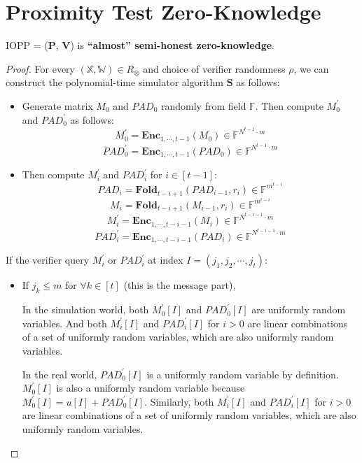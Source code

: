 \section{Proximity Test Zero-Knowledge}

\begin{lemma}
\label{lemma:szkpc-zk}

IOPP = ($\textbf{P}$, $\textbf{V}$) is \textbf{``almost'' semi-honest zero-knowledge}.

\end{lemma}
\begin{proof}

For every $(\mathbb{X}, \mathbb{W}) \in R_\otimes$ and choice of verifier randomness $\rho$, we can construct the polynomial-time simulator algorithm $\textbf{S}$ as follows:


\begin{itemize}
    \item Generate matrix $M_0$ and $PAD_0$ randomly from field $\mathbb{F}$. Then compute $M_0^\prime$ and $PAD_0^\prime$ as follows:
    $$
        M_0^{\prime} = \textbf{Enc}_{1,\cdots,t-1}(M_0) \in \mathbb{F}^{N^{t-1} \cdot m}
    $$
    $$
        PAD_0^{\prime} = \textbf{Enc}_{1,\cdots,t-1}(PAD_0) \in \mathbb{F}^{N^{t-1} \cdot m}
    $$
    \item Then compute $M_i^{\prime}$ and $PAD_i^\prime$ for $i \in [t-1]$:
    $$
        PAD_i = \textbf{Fold}_{t-i+1}(PAD_{i-1}, r_i) \in \mathbb{F}^{m^{t-i}}
    $$
    $$
        M_i = \textbf{Fold}_{t-i+1}(M_{i-1}, r_i) \in \mathbb{F}^{m^{t-i}}
    $$
    $$
        M_i^\prime =  \textbf{Enc}_{1, \cdots, t- i - 1}(M_i) \in \mathbb{F}^{N^{t-i-1} \cdot m}
    $$
    $$
        PAD_i^\prime =  \textbf{Enc}_{1, \cdots, t- i - 1}(PAD_i) \in \mathbb{F}^{N^{t-i-1} \cdot m}
    $$
\end{itemize}

If the verifier query $M_i^{\prime}$ or $PAD_i^\prime$ at index $I = (j_1, j_2, \cdots, j_t)$:

\begin{itemize}
    \item If $j_k \le m$ for $\forall k \in [t]$ (this is the message part),
    
    In the simulation world, both $M_0^\prime[I]$ and $PAD_0^\prime[I]$ are uniformly random variables. And both $M_i^\prime[I]$ and $PAD_i^\prime[I]$ for $i > 0$ are linear combinations of a set of uniformly random variables, which are also uniformly random variables.
    
    In the real world, $PAD_0^\prime[I]$ is a uniformly random variable by definition. $M_0^\prime[I]$ is also a uniformly random variable because $M_0^\prime[I] = u[I] + PAD_0^\prime[I]$. Similarly, both $M_i^\prime[I]$ and $PAD_i^\prime[I]$ for $i > 0$ are linear combinations of a set of uniformly random variables, which are also uniformly random variables.
    

\end{itemize}
\end{proof}
